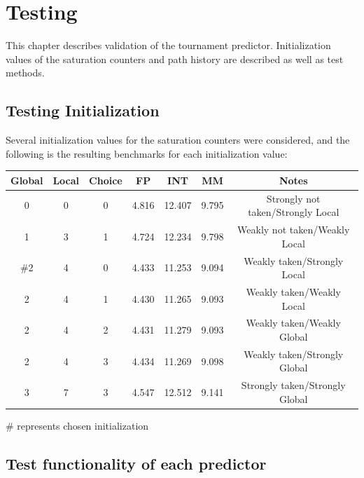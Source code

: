 \documentclass[]{report}   %
\begin{document}
\chapter{Testing}
This chapter describes validation of the tournament predictor. Initialization values of the saturation counters and path history are described as well as test methods.

\section{Testing Initialization}
Several initialization values for the saturation counters were considered, and the following is the resulting benchmarks for each initialization value:

\begin{center}
  \begin{tabular} { c c c c c c c }
    Global & Local & Choice & FP & INT & MM & Notes\\
    \hline
    0 & 0 & 0 & 4.816 & 12.407 & 9.795 & Strongly not taken/Strongly Local\\
    1 & 3 & 1 & 4.724 & 12.234 & 9.798 & Weakly not taken/Weakly Local\\
    \#2 & 4 & 0 & 4.433 & 11.253 & 9.094 & Weakly taken/Strongly Local\\
    2 & 4 & 1 & 4.430 & 11.265 & 9.093 & Weakly taken/Weakly Local\\
    2 & 4 & 2 & 4.431 & 11.279 & 9.093 & Weakly taken/Weakly Global\\
    2 & 4 & 3 & 4.434 & 11.269 & 9.098 & Weakly taken/Strongly Global\\
    3 & 7 & 3 & 4.547 & 12.512 & 9.141 & Strongly taken/Strongly Global\\
  \end{tabular}
\end{center}
\# represents chosen initialization

\section{Test functionality of each predictor}
\end{document}
